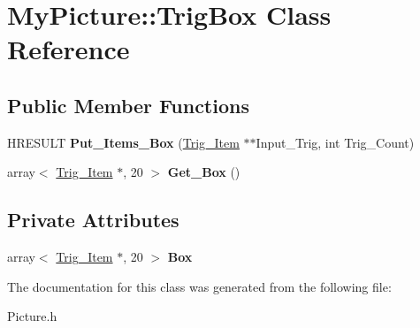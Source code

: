 \hypertarget{class_my_picture_1_1_trig_box}{}\section{My\+Picture\+:\+:Trig\+Box Class Reference}
\label{class_my_picture_1_1_trig_box}
\subsection*{Public Member Functions}
\begin{DoxyCompactItemize}
\item 
\mbox{\label{class_my_picture_1_1_trig_box_ac6bb59247cc55201de7d1c3ffa794023}} 
H\+R\+E\+S\+U\+LT {\bfseries Put\+\_\+\+Items\+\_\+\+Box} (\hyperlink{class_my_picture_1_1_trig___item}{Trig\+\_\+\+Item} $\ast$$\ast$Input\+\_\+\+Trig, int Trig\+\_\+\+Count)
\item 
\mbox{\label{class_my_picture_1_1_trig_box_a5e9ac6462ad8c0333925a3e75c268239}} 
array$<$ \hyperlink{class_my_picture_1_1_trig___item}{Trig\+\_\+\+Item} $\ast$, 20 $>$ {\bfseries Get\+\_\+\+Box} ()
\end{DoxyCompactItemize}
\subsection*{Private Attributes}
\begin{DoxyCompactItemize}
\item 
\mbox{\label{class_my_picture_1_1_trig_box_aa35aeda8265ceb0db77b2b8e07240836}} 
array$<$ \hyperlink{class_my_picture_1_1_trig___item}{Trig\+\_\+\+Item} $\ast$, 20 $>$ {\bfseries Box}
\end{DoxyCompactItemize}


The documentation for this class was generated from the following file\+:\begin{DoxyCompactItemize}
\item 
Picture.\+h\end{DoxyCompactItemize}
